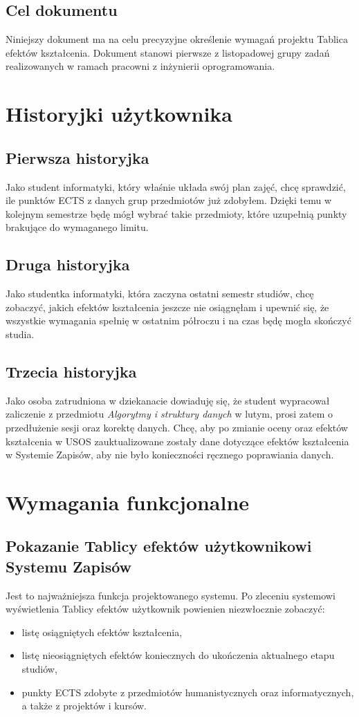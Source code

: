 \documentclass{article}
\begin{document}
\subsection{Cel dokumentu}
Niniejszy dokument ma na celu precyzyjne określenie wymagań projektu Tablica efektów kształcenia.
Dokument stanowi pierwsze z listopadowej grupy zadań realizowanych w ramach pracowni z inżynierii oprogramowania.


\section{Historyjki użytkownika}
\subsection{Pierwsza historyjka}
Jako student informatyki, który właśnie układa swój plan zajęć, chcę sprawdzić, ile punktów ECTS z danych grup przedmiotów już zdobyłem.
Dzięki temu w kolejnym semestrze będę mógł wybrać takie przedmioty, które uzupełnią punkty brakujące do wymaganego limitu.
\subsection{Druga historyjka}
Jako studentka informatyki, która zaczyna ostatni semestr studiów, chcę zobaczyć, jakich efektów kształcenia jeszcze nie osiągnęłam i upewnić się, że wszystkie wymagania spełnię w ostatnim półroczu i na czas będę mogła skończyć studia.
\subsection{Trzecia historyjka}
Jako osoba zatrudniona w dziekanacie dowiaduję się, że student wypracował zaliczenie z przedmiotu \textit{Algorytmy i struktury danych} w lutym, prosi zatem o przedłużenie sesji oraz korektę danych. 
Chcę, aby po zmianie oceny oraz efektów kształcenia w USOS zauktualizowane zostały dane dotyczące efektów kształcenia w Systemie Zapisów, aby nie było konieczności ręcznego poprawiania danych.


\section{Wymagania funkcjonalne}

\subsection{Pokazanie Tablicy efektów użytkownikowi Systemu Zapisów}
Jest to najważniejsza funkcja projektowanego systemu.
Po zleceniu systemowi wyświetlenia Tablicy efektów użytkownik powienien niezwłocznie zobaczyć:
\begin{itemize}
	\item listę osiągniętych efektów kształcenia,
	\item listę nieosiągniętych efektów koniecznych do ukończenia aktualnego etapu studiów,
	\item punkty ECTS zdobyte z przedmiotów humanistycznych oraz informatycznych, a także z projektów i kursów.
\end{itemize}
\end{document}
